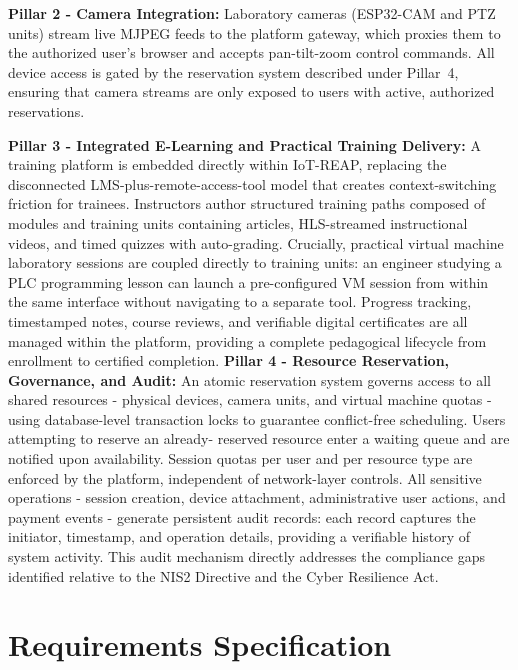 \textbf{Pillar 2 - Camera Integration:}
Laboratory cameras (ESP32-CAM and PTZ units) stream live MJPEG feeds to the platform gateway,
which proxies them to the authorized user's browser and accepts pan-tilt-zoom
control commands. All device access is gated by the reservation system described
under Pillar~4, ensuring that camera streams are only exposed to users with active, authorized reservations.

\textbf{Pillar 3 - Integrated E-Learning and Practical Training Delivery:}
A training platform is embedded directly within IoT-REAP, replacing the disconnected
LMS-plus-remote-access-tool model that creates context-switching friction for trainees.
Instructors author structured training paths composed of modules and training units
containing articles, HLS-streamed instructional videos, and timed quizzes with
auto-grading. Crucially, practical virtual machine laboratory sessions are coupled
directly to training units: an engineer studying a PLC programming lesson can launch
a pre-configured VM session from within the same interface without navigating to a
separate tool. Progress tracking, timestamped notes, course reviews, and verifiable
digital certificates are all managed within the platform, providing a complete
pedagogical lifecycle from enrollment to certified completion.
\newpage
\textbf{Pillar 4 - Resource Reservation, Governance, and Audit:}
An atomic reservation system governs access to all shared resources - physical
devices, camera units, and virtual machine quotas - using database-level transaction
locks to guarantee conflict-free scheduling. Users attempting to reserve an already-
reserved resource enter a waiting queue and are notified upon availability. Session
quotas per user and per resource type are enforced by the platform, independent of
network-layer controls. All sensitive operations - session creation, device
attachment, administrative user actions, and payment events - generate persistent
audit records: each record captures the initiator, timestamp, and operation details,
providing a verifiable history of system activity. This audit mechanism
directly addresses the compliance gaps identified relative to the NIS2 Directive and
the Cyber Resilience Act.

\section{Requirements Specification}
\label{sec:requirements}

